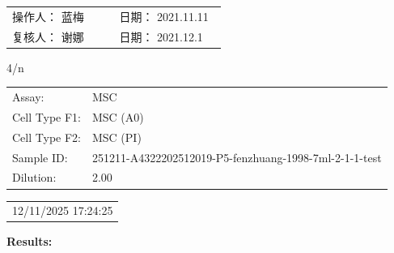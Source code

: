 \documentclass[UTF8,10pt,a4paper,fontset=fandol]{ctexart}
\newcommand{\fieldvalue}[1]{#1}
\newcommand{\handwritten}[1]{#1}
\begin{document}
\vfill

\noindent
\begin{tabular}{@{}p{0.47\linewidth}p{0.47\linewidth}@{}}
操作人：
\fieldvalue{\handwritten{蓝梅}}
&
日期：
\fieldvalue{\handwritten{2021.11.11}}
\\[0.8em]
复核人：
\fieldvalue{\handwritten{谢娜}}
&
日期：
\fieldvalue{\handwritten{2021.12.1}}
\end{tabular}

\vspace{2em}

\handwritten{4/n}

\newpage

\noindent
\begin{tabular}{@{}ll@{}}
Assay: &
\fieldvalue{MSC}
\\[2pt]
Cell Type F1: &
\fieldvalue{MSC (A0)}
\\[2pt]
Cell Type F2: &
\fieldvalue{MSC (PI)}
\\[2pt]
Sample ID: &
\fieldvalue{251211-A4322202512019-P5-fenzhuang-1998-7ml-2-1-1-test}
\\[2pt]
Dilution: &
\fieldvalue{2.00}
\end{tabular}
\hfill
\begin{tabular}{@{}r@{}}
\fieldvalue{12/11/2025 17:24:25}
\end{tabular}

\bigskip

\noindent\textbf{Results:}

\medskip
\end{document}
